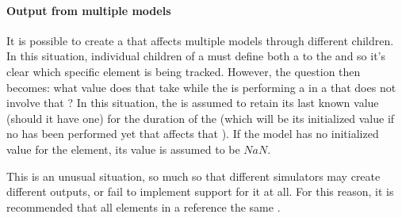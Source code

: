 \paragraph*{Output from multiple models}
\label{sec:multiModelOutput}
It is possible to create a \RepeatedTask that affects multiple models through different \SubTask children.  In this situation, individual \Variable children of a \DataGenerator must define both a  to the \RepeatedTask and  so it's clear which specific element is being tracked.  However, the question then becomes: what value does that \Variable take while the \RepeatedTask is performing a \Simulation in a \SubTask that does not involve that \Model?  In this situation, the \Variable is assumed to retain its last known value (should it have one) for the duration of the \Simulation (which will be its initialized value if no \Simulation has been performed yet that affects that \Variable).  If the model has no initialized value for the element, its value is assumed to be $NaN$.

This is an unusual situation, so much so that different simulators may create different outputs, or fail to implement support for it at all.  For this reason, it is recommended that all \SubTask elements in a \RepeatedTask reference the same \Model.



